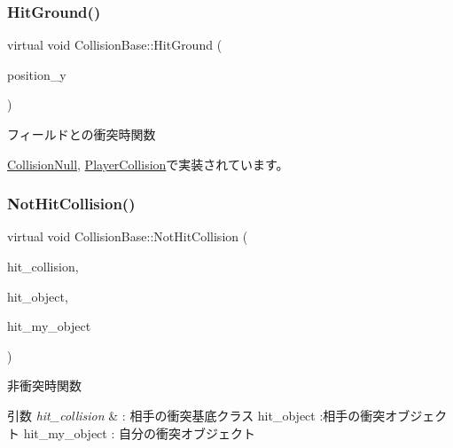\subsubsection{\texorpdfstring{Hit\+Ground()}{HitGround()}}
{\footnotesize\ttfamily virtual void Collision\+Base\+::\+Hit\+Ground (\begin{DoxyParamCaption}\item[{float}]{position\+\_\+y }\end{DoxyParamCaption})\hspace{0.3cm}{\ttfamily [pure virtual]}}



フィールドとの衝突時関数 



\mbox{\hyperlink{class_collision_null_a75900c2cec4e49336701e2e3c64e5bfe}{Collision\+Null}}, \mbox{\hyperlink{class_player_collision_a3522ce17b1e1752f2737c2243582ecb0}{Player\+Collision}}で実装されています。

\mbox{\label{class_collision_base_a9b64fc5c3f2aac2a05296985ef799fb1}} 
\subsubsection{\texorpdfstring{Not\+Hit\+Collision()}{NotHitCollision()}}
{\footnotesize\ttfamily virtual void Collision\+Base\+::\+Not\+Hit\+Collision (\begin{DoxyParamCaption}\item[{\mbox{\hyperlink{class_collision_base}{Collision\+Base}} $\ast$}]{hit\+\_\+collision,  }\item[{\mbox{\hyperlink{class_collision_object}{Collision\+Object}} $\ast$}]{hit\+\_\+object,  }\item[{\mbox{\hyperlink{class_collision_object}{Collision\+Object}} $\ast$}]{hit\+\_\+my\+\_\+object }\end{DoxyParamCaption})\hspace{0.3cm}{\ttfamily [pure virtual]}}



非衝突時関数 


\begin{DoxyParams}{引数}
{\em hit\+\_\+collision} & \+: 相手の衝突基底クラス hit\+\_\+object \+:相手の衝突オブジェクト hit\+\_\+my\+\_\+object \+: 自分の衝突オブジェクト \\
\hline
\end{DoxyParams}


